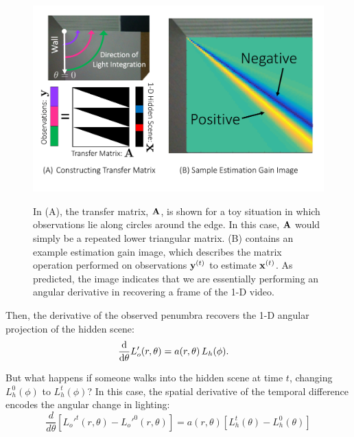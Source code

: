 \begin{figure}[tb]
\centering
\vspace{-1em}
{\includegraphics[width=1\linewidth]{figs/transfermtx2.pdf}}
\vspace{-.3in}
\caption{\label{fig:transfermtx} 
In (A), the transfer matrix, $\mathbf{A}$, is shown for a toy situation in which observations lie along circles around the edge. %
In this case, $\mathbf{A}$ would simply be a repeated lower triangular matrix. (B) contains an example estimation gain image, which describes the matrix operation performed on observations $\mathbf{y}^{(t)}$ to estimate $\mathbf{x}^{(t)}$. As predicted, the image indicates that we are essentially performing an angular derivative in recovering a frame of the 1-D video.}
\vspace{-1em}
\end{figure}


Then, the derivative of the observed penumbra 
recovers the 1-D angular projection of the hidden scene: 
\begin{align}
\frac{\mathrm{d}}{\mathrm{d}\theta} L'_o(r,\theta) &= a(r,\theta) \,  L_h(\phi) .
\end{align}

But what happens if someone walks into the hidden scene at time $t$, changing $L^{0}_h(\phi)$ to $L^{t}_h(\phi)$? In this case, the spatial derivative of the temporal difference encodes the angular change in lighting: 
\begin{equation}
\frac{d}{d \theta} \left[ L_o'^{t}(r,\theta) - L_o'^{0}(r,\theta) \right] = a(r,\theta) \left[ L^{t}_h(\theta) -  L^{0}_h(\theta)  \right]
\label{eq:subtract_out}
\end{equation}

